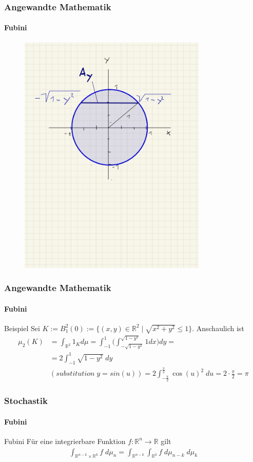 \documentclass{beamer}
\begin{document}
\begin{frame}
    \frametitle{Angewandte Mathematik}
\framesubtitle{Fubini}
\begin{figure}[H]
      \centering
    \includegraphics[width=0.8\textwidth]{img/Kreis}
\end{figure}
 \end{frame}

 \begin{frame}
    \frametitle{Angewandte Mathematik}
    \framesubtitle{Fubini}
    \begin{block}{Beispiel}
Sei $K := B^2_1(0) := \{   (x,y) \in \mathbb{R}^2 \; | \; \sqrt{x^2 + y^2 } \leq 1\}$. Anschaulich ist
\begin{align*}
\mu_2(K) &  = \int_{\mathbb{R}^2} 1_K  d \mu =  \int_{-1}^{1} \biggl ( \int_{-\sqrt{1- y^2}}^{\sqrt{1- y^2}} 1 dx \biggr ) dy = \\ 
& =  2 \int_{-1}^{1}  \sqrt{1 - y^2}   \; dy  \\ 
 & (substitution \;   y = sin(u)) =   2 \int_{-\frac{\pi}{2}}^{\frac{\pi}{2}}   \cos(u)^2   \; du = 2 \cdot \frac{\pi}{2} = \pi
\end{align*}
\end{block}
 \end{frame}
 
 \begin{frame}
    \frametitle{Stochastik}
\framesubtitle{Fubini}
    \begin{block}{Fubini}
        Für eine integrierbare Funktion $f: \mathbb{R}^n \to \mathbb{R}$ gilt
        \begin{align*}
        \int_{\mathbb{R}^{n-k} \times \mathbb{R}^{k}} f \; d\mu_n  =  \int_{\mathbb{R}^{n-k}}  \int_{\mathbb{R}^k}  f \; d\mu_{n-k} \;  d\mu_k  
        \end{align*}
    \end{block}

\end{frame}
\end{document}
